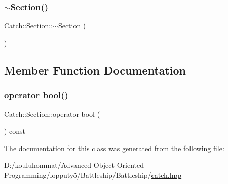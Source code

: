\mbox{\label{class_catch_1_1_section_aa1422edd68a77aa578b5cc6b8b69f86f}} 
\subsubsection{\texorpdfstring{$\sim$\+Section()}{~Section()}}
{\footnotesize\ttfamily Catch\+::\+Section\+::$\sim$\+Section (\begin{DoxyParamCaption}{ }\end{DoxyParamCaption})}



\subsection{Member Function Documentation}
\mbox{\label{class_catch_1_1_section_a0632b804dcea1417a2970620a9742eb3}} 
\subsubsection{\texorpdfstring{operator bool()}{operator bool()}}
{\footnotesize\ttfamily Catch\+::\+Section\+::operator bool (\begin{DoxyParamCaption}{ }\end{DoxyParamCaption}) const\hspace{0.3cm}{\ttfamily [explicit]}}



The documentation for this class was generated from the following file\+:\begin{DoxyCompactItemize}
\item 
D\+:/kouluhommat/\+Advanced Object-\/\+Oriented Programming/lopputyö/\+Battleship/\+Battleship/\mbox{\hyperlink{catch_8hpp}{catch.\+hpp}}\end{DoxyCompactItemize}
